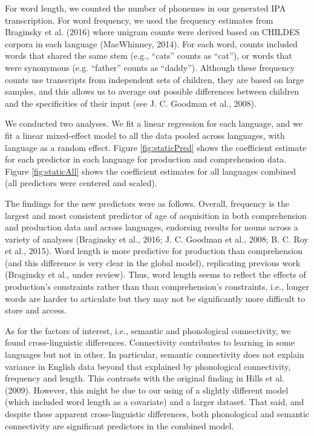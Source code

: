 \documentclass[english,floatsintext,man]{apa6}
\theoremstyle{definition}
\theoremstyle{definition}
\theoremstyle{definition}
\theoremstyle{remark}
\begin{document}
For word length, we counted the number of phonemes in our generated IPA
transcription. For word frequency, we used the frequency estimates from
Braginsky et al. (2016) where unigram counts were derived based on
CHILDES corpora in each language (MacWhinney, 2014). For each word,
counts included words that shared the same stem (e.g., \enquote{cats}
counts as \enquote{cat}), or words that were synonymous (e.g.
\enquote{father} counts as \enquote{daddy}). Although these frequency
counts use transcripts from independent sets of children, they are based
on large samples, and this allows us to average out possible differences
between children and the specificities of their input (see J. C. Goodman
et al., 2008).

We conducted two analyses. We fit a linear regression for each language,
and we fit a linear mixed-effect model to all the data pooled across
languages, with language as a random effect. Figure \ref{fig:staticPred}
shows the coefficient estimate for each predictor in each language for
production and comprehension data. Figure \ref{fig:staticAll} shows the
coefficient estimates for all languages combined (all predictors were
centered and scaled).

The findings for the new predictors were as follows. Overall, frequency
is the largest and most consistent predictor of age of acquisition in
both comprehension and production data and across languages, endorsing
results for nouns across a variety of analyses (Braginsky et al., 2016;
J. C. Goodman et al., 2008; B. C. Roy et al., 2015). Word length is more
predictive for production than comprehension (and this difference is
very clear in the global model), replicating previous work (Braginsky et
al., under review). Thus, word length seems to reflect the effects of
production's constraints rather than than comprehension's constraints,
i.e., longer words are harder to articulate but they may not be
significantly more difficult to store and access.

As for the factors of interest, i.e., semantic and phonological
connectivity, we found cross-linguistic differences. Connectivity
contributes to learning in some languages but not in other. In
particular, semantic connectivity does not explain variance in English
data beyond that explained by phonological connectivity, frequency and
length. This contrasts with the original finding in Hills et al. (2009).
However, this might be due to our using of a slightly different model
(which included word length as a covariate) and a larger dataset. That
said, and despite these apparent cross-linguistic differences, both
phonological and semantic connectivity are significant predictors in the
combined model.
\end{document}
